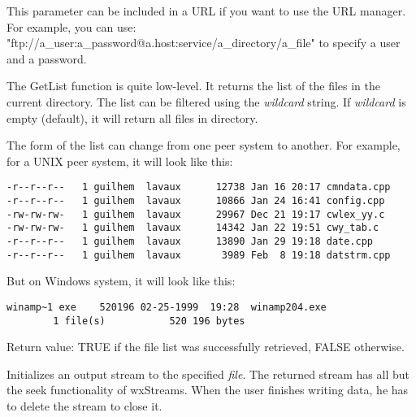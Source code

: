 
This parameter can be included in a URL if you want to use the URL manager.
For example, you can use: "ftp://a\_user:a\_password@a.host:service/a\_directory/a\_file"
to specify a user and a password.



The GetList function is quite low-level. It returns the list of the files in
the current directory. The list can be filtered using the {\it wildcard} string.
If {\it wildcard} is empty (default), it will return all files in directory.

The form of the list can change from one peer system to another. For example,
for a UNIX peer system, it will look like this:

\begin{verbatim}
-r--r--r--   1 guilhem  lavaux      12738 Jan 16 20:17 cmndata.cpp
-r--r--r--   1 guilhem  lavaux      10866 Jan 24 16:41 config.cpp
-rw-rw-rw-   1 guilhem  lavaux      29967 Dec 21 19:17 cwlex_yy.c
-rw-rw-rw-   1 guilhem  lavaux      14342 Jan 22 19:51 cwy_tab.c
-r--r--r--   1 guilhem  lavaux      13890 Jan 29 19:18 date.cpp
-r--r--r--   1 guilhem  lavaux       3989 Feb  8 19:18 datstrm.cpp
\end{verbatim}

But on Windows system, it will look like this:

\begin{verbatim}
winamp~1 exe    520196 02-25-1999  19:28  winamp204.exe
        1 file(s)           520 196 bytes
\end{verbatim}

Return value: TRUE if the file list was successfully retrieved, FALSE
otherwise.




Initializes an output stream to the specified {\it file}. The returned
stream has all but the seek functionality of wxStreams. When the user finishes
writing data, he has to delete the stream to close it.

